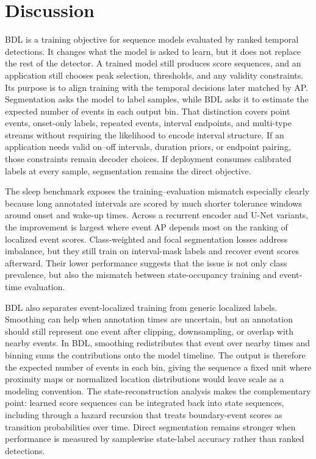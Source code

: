 \section{Discussion}
\label{sec:limitations}

BDL is a training objective for sequence models evaluated by ranked temporal detections.
It changes what the model is asked to learn, but it does not replace the rest of the detector.
A trained model still produces score sequences, and an application still chooses peak selection, thresholds, and any validity constraints.
Its purpose is to align training with the temporal decisions later matched by AP.
Segmentation asks the model to label samples, while BDL asks it to estimate the expected number of events in each output bin.
That distinction covers point events, onset-only labels, repeated events,
interval endpoints, and multi-type streams without requiring the likelihood to
encode interval structure.
If an application needs valid on--off intervals, duration priors, or endpoint pairing,
those constraints remain decoder choices.
If deployment consumes calibrated labels at every sample, segmentation remains
the direct objective.

The sleep benchmark exposes the training--evaluation mismatch especially clearly because long annotated intervals are scored by much shorter tolerance windows around onset and wake-up times.
Across a recurrent encoder and U-Net variants, the improvement is largest where event AP depends most on the ranking of localized event scores.
Class-weighted and focal segmentation losses address imbalance, but they still train on interval-mask labels and recover event scores afterward.
Their lower performance suggests that the issue is not only class prevalence, but also the mismatch between state-occupancy training and event-time evaluation.

BDL also separates event-localized training from generic localized labels.
Smoothing can help when annotation times are uncertain, but an annotation
should still represent one event after clipping, downsampling, or overlap
with nearby events.
In BDL, smoothing redistributes that event over nearby times and binning sums
the contributions onto the model timeline.
The output is therefore the expected number of events in each bin, giving the
sequence a fixed unit where proximity maps or normalized location distributions
would leave scale as a modeling convention.
The state-reconstruction analysis makes the complementary point: learned
score sequences can be integrated back into state sequences, including through
a hazard recursion that treats boundary-event scores as transition
probabilities over time.
Direct segmentation remains stronger when performance is measured by
samplewise state-label accuracy rather than ranked detections.

